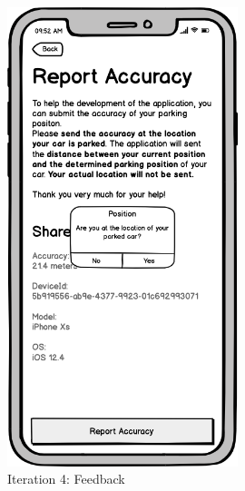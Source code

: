 \begin{figure}[H]
  \centering
  \begin{minipage}[b]{0.45\textwidth}
    \centering
    \includegraphics[width=0.6\textwidth]{images/UI/Iteration4-Feedback-Confirmation.png}
    \caption{Iteration 4: Feedback}
    \label{fig:i4-feedback-con}
  \end{minipage}
  \hfill
  \begin{minipage}[b]{0.45\textwidth}
    \centering

\end{minipage}
\end{figure}
